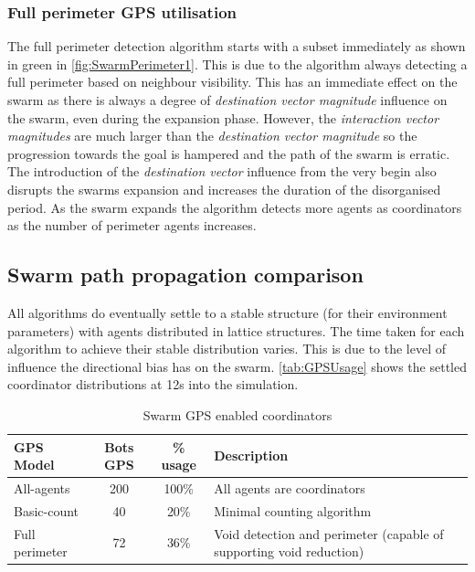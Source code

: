 \subsubsection{Full perimeter GPS utilisation\label{section:SwarmPerimeter4}}
The full perimeter detection algorithm starts with a subset immediately as shown in green in \autoref{fig:SwarmPerimeter1}. This is due to the algorithm always detecting a full perimeter based on neighbour visibility. This has an immediate effect on the swarm as there is always a degree of \textit{destination vector magnitude} influence on the swarm, even during the expansion phase. However, the \textit{interaction vector magnitudes} are much larger than the \textit{destination vector magnitude} so the progression towards the goal is hampered and the path of the swarm is erratic. The introduction of the \textit{destination vector} influence from the very begin also disrupts the swarms expansion and increases the duration of the disorganised period. As the swarm expands the algorithm detects more agents as coordinators as the number of perimeter agents increases.

\subsection{Swarm path propagation comparison\label{section:compareBaselineAll1}}
All algorithms do eventually settle to a stable structure (for their environment parameters) with agents distributed in lattice structures. The time taken for each algorithm to achieve their stable distribution varies. This is due to the level of influence the directional bias has on the swarm. \autoref{tab:GPSUsage} shows the settled coordinator distributions at 12s into the simulation.

\begin{table}[H]
\begin{center}
\begin{tabular}{| p{2.5cm} | c | c | p{5cm} |}
\hline
GPS Model & Bots GPS & \% usage & Description \\ \hline
All-agents & 200 & 100\% & All agents are coordinators \\ \hline
Basic-count & 40 & 20\% & Minimal counting algorithm\\ \hline
Full perimeter & 72 & 36\% & Void detection and perimeter (capable of supporting void reduction)\\  \hline
\end{tabular}\caption{Swarm GPS enabled coordinators} \label{tab:GPSUsage}
\end{center}
\end{table}

